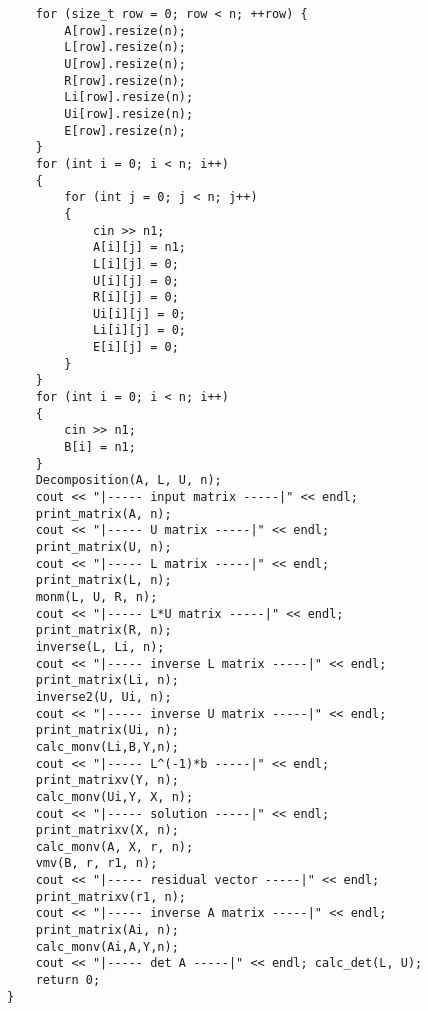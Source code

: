 \documentclass[14pt,a4paper]{scrartcl}
\theoremstyle{definition}
\theoremstyle{remark}
\theoremstyle{definition}
\theoremstyle{definition}
\begin{document}
{\begin{lstlisting}
	for (size_t row = 0; row < n; ++row) {
		A[row].resize(n);
		L[row].resize(n);
		U[row].resize(n);
		R[row].resize(n);
		Li[row].resize(n);
		Ui[row].resize(n);
		E[row].resize(n);
	}
	for (int i = 0; i < n; i++)
	{
		for (int j = 0; j < n; j++)
		{
			cin >> n1;
			A[i][j] = n1;
			L[i][j] = 0;
			U[i][j] = 0;
			R[i][j] = 0;
			Ui[i][j] = 0;
			Li[i][j] = 0;
			E[i][j] = 0;
		}
	}
	for (int i = 0; i < n; i++)
	{
		cin >> n1;
		B[i] = n1;
	}
	Decomposition(A, L, U, n);
	cout << "|----- input matrix -----|" << endl;
	print_matrix(A, n);
	cout << "|----- U matrix -----|" << endl;
	print_matrix(U, n);
	cout << "|----- L matrix -----|" << endl;
	print_matrix(L, n);
	monm(L, U, R, n);
	cout << "|----- L*U matrix -----|" << endl;
	print_matrix(R, n);
	inverse(L, Li, n);
	cout << "|----- inverse L matrix -----|" << endl;
	print_matrix(Li, n);
	inverse2(U, Ui, n);
	cout << "|----- inverse U matrix -----|" << endl;
	print_matrix(Ui, n);
	calc_monv(Li,B,Y,n);
	cout << "|----- L^(-1)*b -----|" << endl;
	print_matrixv(Y, n);
	calc_monv(Ui,Y, X, n);
	cout << "|----- solution -----|" << endl;
	print_matrixv(X, n);
	calc_monv(A, X, r, n);
	vmv(B, r, r1, n);
	cout << "|----- residual vector -----|" << endl;
	print_matrixv(r1, n);
	cout << "|----- inverse A matrix -----|" << endl;
	print_matrix(Ai, n);
	calc_monv(Ai,A,Y,n);
	cout << "|----- det A -----|" << endl; calc_det(L, U);
	return 0;
}
\end{lstlisting}}
\end{document}
